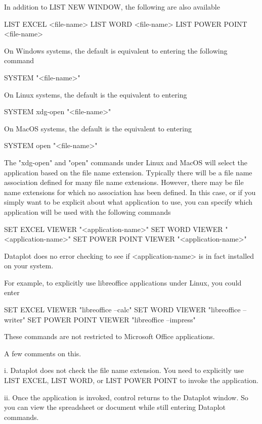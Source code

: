        In addition to LIST NEW WINDOW, the following are also available

          LIST EXCEL <file-name>
          LIST WORD <file-name>
          LIST POWER POINT <file-name>

       On Windows systems, the default is equivalent to entering
       the following command

             SYSTEM "<file-name>"

       On Linux systems, the default is the equivalent to entering

             SYSTEM xdg-open "<file-name>"

       On MacOS systems, the default is the equivalent to entering

             SYSTEM open "<file-name>"

       The "xdg-open" and "open" commands under Linux and MacOS
       will select the application based on the file name extension.
       Typically there will be a file name association defined for
       many file name extensions.  However, there may be file name
       extensions for which no association has been defined.  In this
       case, or if you simply want to be explicit about what application
       to use, you can specify which application will be used with the
       following commands

             SET EXCEL VIEWER        "<application-name>"
             SET WORD VIEWER         "<application-name>"
             SET POWER POINT VIEWER  "<application-name>"

       Dataplot does no error checking to see if <application-name>
       is in fact installed on your system.

       For example, to explicitly use libreoffice applications
       under Linux, you could enter

             SET EXCEL VIEWER       "libreoffice --calc"
             SET WORD  VIEWER       "libreoffice --writer"
             SET POWER POINT VIEWER "libreoffice --impress"

       These commands are not restricted to Microsoft Office
       applications.

       A few comments on this.

           i. Dataplot does not check the file name extension.
              You need to explicitly use LIST EXCEL, LIST WORD,
              or LIST POWER POINT to invoke the application.

          ii. Once the application is invoked, control returns
              to the Dataplot window.  So you can view the
              spreadsheet or document while still entering Dataplot
              commands.

